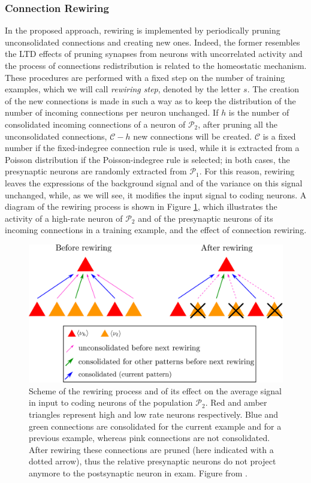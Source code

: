 \documentclass[a4paper, 12pt, twoside, openright]{book}
\newcommand{\popI}{\mathcal{P}_1}
\newcommand{\popII}{\mathcal{P}_2}
\newcommand{\C}{\mathcal{C}}
\begin{document}
\subsubsection{\label{subseq:rewiring} Connection Rewiring}
In the proposed approach, rewiring is implemented by periodically pruning unconsolidated connections and creating new ones. Indeed, the former resembles the LTD effects of pruning synapses from neurons with uncorrelated activity and the process of connections redistribution is related to the homeostatic mechanism. These procedures are performed with a fixed step on the number of training examples, which we will call {\it rewiring step}, denoted by the letter $s$.
The creation of the new connections is made in such a way as to keep the distribution of the number of incoming connections per neuron unchanged.
If $h$ is the number of consolidated incoming connections of a neuron of $\popII$, after pruning all the unconsolidated connections, $\C - h$ new connections will be created. $\C$ is a fixed number if the fixed-indegree connection rule is used, while it is extracted from a Poisson distribution if the Poisson-indegree rule is selected; in both cases, the presynaptic neurons are randomly extracted from $\popI$. For this reason, rewiring leaves the expressions of the background signal and of the variance on this signal unchanged, while, as we will see, it modifies the input signal to coding neurons.
A diagram of the rewiring process is shown in Figure \ref{fig:rewiring}, which illustrates the activity of a high-rate neuron of $\popII$ and of the presynaptic neurons of its incoming connections in a training example, and the effect of connection rewiring. 

\begin{figure}[H]
\centering
\includegraphics[width=0.8\columnwidth]{figures/rewiring.png}
\caption{
     Scheme of the rewiring process and of its effect on the average signal in input to coding neurons of the population $\popII$. Red and amber triangles represent high and low rate neurons respectively. Blue and green connections are consolidated for the current example and for a previous example, whereas pink connections are not consolidated. After rewiring these connections are pruned (here indicated with a dotted arrow), thus the relative presynaptic neurons do not project anymore to the postsynaptic neuron in exam. Figure from \cite{Tiddia2023}.
\label{fig:rewiring}}
\end{figure}
\end{document}
